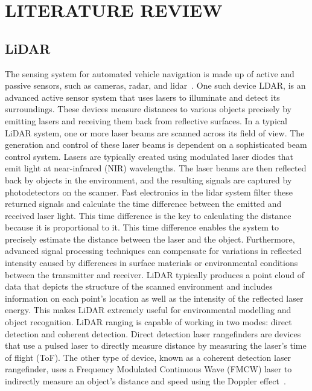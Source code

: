 \section{LITERATURE REVIEW}
\label{sec:literature_review}
\subsection{LiDAR}
\label{subsec:lidar}
The sensing system for automated vehicle navigation is made up of active and passive sensors, such as cameras, radar, and lidar~\cite{lidar}.
One such device LDAR, is an advanced active sensor system that uses lasers to illuminate 
and detect its surroundings. These devices measure distances to various objects precisely 
by emitting lasers and receiving them back from reflective surfaces. 
In a typical LiDAR system, one or more laser beams are scanned across its field of view. 
The generation and control of these laser beams is dependent on a sophisticated beam control system.
Lasers are typically created using modulated laser diodes that emit light at near-infrared (NIR) wavelengths. 
The laser beams are then reflected back by objects in the environment, and the resulting signals are captured by photodetectors on the scanner. Fast electronics in the lidar system filter these returned signals and calculate the time difference between the emitted and received laser light. 
This time difference is the key to calculating the distance because it is proportional to it. 
This time difference enables the system to precisely estimate the distance between the laser and the object. 
Furthermore, advanced signal processing techniques can compensate for variations 
in reflected intensity caused by differences in surface materials or environmental conditions 
between the transmitter and receiver. 
LiDAR typically produces a point cloud of data that depicts the structure of the scanned environment 
and includes information on each point's location as well as the intensity of the reflected laser energy. 
This makes LiDAR extremely useful for environmental modelling and object recognition.
LiDAR ranging is capable of working in two modes: direct detection and coherent detection. 
Direct detection laser rangefinders are devices that use a pulsed laser 
to directly measure distance by measuring the laser's time of flight (ToF). 
The other type of device, known as a coherent detection laser rangefinder, 
uses a Frequency Modulated Continuous Wave (FMCW) laser 
to indirectly measure an object's distance and speed using the Doppler effect~\cite{lidarintro}. 


